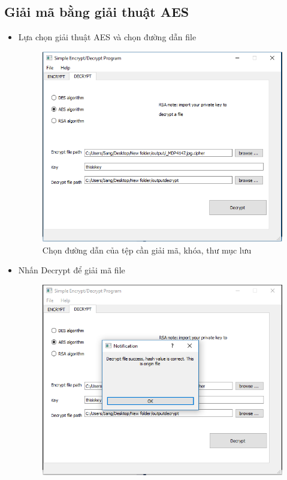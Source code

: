 \documentclass[a4paper]{article}
\begin{document}
	\subsection{Giải mã bằng giải thuật AES}
	\begin{itemize}
	
	\item
	Lựa chọn giải thuật AES và chọn đường dẫn file
\begin{center}
    \begin{figure}[H]
    \begin{center}
     \includegraphics[scale=.5]{hinh/decrypt-aes-1}
    \end{center}
    \caption{Chọn đường dẫn của tệp cần giải mã, khóa, thư mục lưu}
    \label{refhinh8}
    \end{figure}
\end{center}
	\item
Nhấn Decrypt để giải mã file
\begin{center}
    \begin{figure}[H]
    \begin{center}
     \includegraphics[scale=.5]{hinh/decrypt-aes-2}

\end{center}
\end{figure}
\end{center}
\end{itemize}
\end{document}
